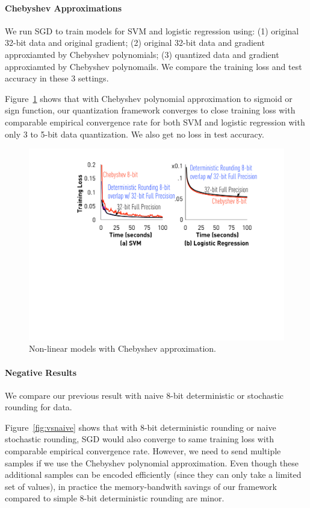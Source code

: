 \documentclass{article}
\begin{document}
\paragraph{Chebyshev Approximations}
We run SGD to train models for SVM and logistic regression using:
(1) original 32-bit data and original gradient; (2) original 32-bit data and gradient approxiamted by Chebyshev polynomials;
(3) quantized data and gradient approxiamted by Chebyshev polynomails.
We compare the training loss and test accuracy in these 3 settings.

Figure~\ref{fig:chebyshev} shows that with Chebyshev polynomial approximation to sigmoid 
or sign function, our quantization framework
converges to close training loss with comparable
empirical convergence rate for both SVM and logistic regression
with only 3 to 5-bit data quantization. We also get no loss in test accuracy.

\begin{figure}[t]
\centering
\includegraphics[width=\columnwidth]{final-experiments/chebyshev} 
\caption{Non-linear models with Chebyshev approximation.}
\label{fig:chebyshev}
\end{figure}

\paragraph{Negative Results}
We compare our previous result with naive 8-bit deterministic or stochastic rounding for data.

Figure~\ref{fig:vsnaive} shows that with 8-bit deterministic rounding or naive
stochastic rounding, SGD would also converge to same training loss with comparable
empirical convergence rate. However, we need to send multiple samples if we use the Chebyshev polynomial approximation. 
Even though these additional samples can be encoded efficiently (since they can only take a limited set of values), 
in practice the memory-bandwith savings of our framework
compared to simple 8-bit deterministic rounding are minor. 
\end{document}
